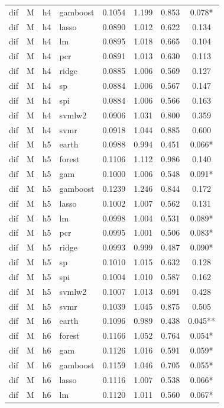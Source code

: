 \begin{ThreePartTable}
\begin{longtable}[t]{llclcccc}
dif & M & h4 & gamboost & 0.1054 & 1.199 & 0.853 & 0.078*\\
dif & M & h4 & lasso & 0.0890 & 1.012 & 0.622 & 0.134\\
dif & M & h4 & lm & 0.0895 & 1.018 & 0.665 & 0.104\\
dif & M & h4 & pcr & 0.0891 & 1.013 & 0.630 & 0.113\\
dif & M & h4 & ridge & 0.0885 & 1.006 & 0.569 & 0.127\\
dif & M & h4 & sp & 0.0884 & 1.006 & 0.567 & 0.147\\
dif & M & h4 & spi & 0.0884 & 1.006 & 0.566 & 0.163\\
dif & M & h4 & svmlw2 & 0.0906 & 1.031 & 0.800 & 0.359\\
dif & M & h4 & svmr & 0.0918 & 1.044 & 0.885 & 0.600\\
\addlinespace
dif & M & h5 & earth & 0.0988 & 0.994 & 0.451 & 0.066*\\
dif & M & h5 & forest & 0.1106 & 1.112 & 0.986 & 0.140\\
dif & M & h5 & gam & 0.1000 & 1.006 & 0.548 & 0.091*\\
dif & M & h5 & gamboost & 0.1239 & 1.246 & 0.844 & 0.172\\
dif & M & h5 & lasso & 0.1002 & 1.007 & 0.562 & 0.131\\
dif & M & h5 & lm & 0.0998 & 1.004 & 0.531 & 0.089*\\
dif & M & h5 & pcr & 0.0995 & 1.001 & 0.506 & 0.083*\\
dif & M & h5 & ridge & 0.0993 & 0.999 & 0.487 & 0.090*\\
dif & M & h5 & sp & 0.1010 & 1.015 & 0.632 & 0.128\\
dif & M & h5 & spi & 0.1004 & 1.010 & 0.587 & 0.162\\
dif & M & h5 & svmlw2 & 0.1007 & 1.013 & 0.691 & 0.428\\
dif & M & h5 & svmr & 0.1039 & 1.045 & 0.875 & 0.505\\
\addlinespace
dif & M & h6 & earth & 0.1096 & 0.989 & 0.438 & 0.045**\\
dif & M & h6 & forest & 0.1166 & 1.052 & 0.764 & 0.054*\\
dif & M & h6 & gam & 0.1126 & 1.016 & 0.591 & 0.059*\\
dif & M & h6 & gamboost & 0.1159 & 1.046 & 0.705 & 0.055*\\
dif & M & h6 & lasso & 0.1116 & 1.007 & 0.538 & 0.066*\\
dif & M & h6 & lm & 0.1120 & 1.011 & 0.560 & 0.067*\\

\end{longtable}
\end{ThreePartTable}
